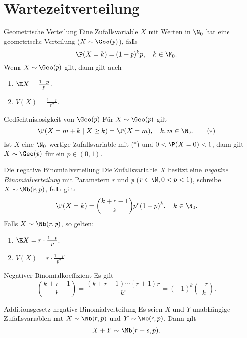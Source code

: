 \section*{Wartezeitverteilung}

\begin{karte}{Geometrische Verteilung}
    Eine Zufallsvariable \( X \) mit Werten in \( \N_0 \)
    hat eine geometrische Verteilung (\( X \sim \Geo(p) \)), falls 
    \[ \P(X=k) = (1-p)^k p, \quad k\in\N_0. \]
    Wenn \( X \sim \Geo(p) \) gilt, dann gilt auch 
    \begin{enumerate}
        \item \( \E X = \frac{1-p}{p} \).
        \item \( V(X) = \frac{1-p}{p^2} \).
    \end{enumerate}
\end{karte}

\begin{karte}{Gedächtnislosigkeit von \( \Geo(p) \)}
    Für \( X \sim \Geo(p) \) gilt 
    \[ \P(X = m+k \;|\; X \geq k ) = \P(X = m), \quad k,m\in\N_0. \tag{\(*\)} \]
    Ist \( X \) eine \( \N_0 \)-wertige Zufallsvariable mit (\(*\)) 
    und \( 0 < \P(X = 0) < 1 \), dann gilt \( X \sim \Geo(p) \) 
    für ein \( p\in (0,1) \).
\end{karte}

\begin{karte}{Die negative Binomialverteilung}
    Die Zufallsvariable \( X \) besitzt eine \textit{negative Binomialverteilung} 
    mit Parametern \( r \) und \( p \) (\( r\in \N, 0<p<1 \)), schreibe 
    \( X \sim \Nb(r,p) \), falls gilt: 
    \[ \P(X = k) = \binom{k + r - 1}{k} p^r (1-p)^k, \quad k \in \N_0. \]
    Falls \( X \sim \Nb(r,p) \), so gelten:
    \begin{enumerate}
        \item \( \E X = r \cdot \frac{1-p}{p} \).
        \item \( V(X) = r \cdot \frac{1-p}{p^2} \)
    \end{enumerate}
\end{karte}

\begin{karte}{Negativer Binomialkoeffizient}
    Es gilt 
    \[ \binom{k+r-1}{k} = \frac{ (k + r - 1)\cdots (r + 1) r }{k!}
    = (-1)^k \binom{-r}{k}. \]
\end{karte}

\begin{karte}{Additionsgesetz negative Binomialverteilung}
    Es seien \( X \) und \(Y\) unabhängige Zufallsvariablen 
    mit \( X \sim \Nb(r,p) \) und \( Y \sim \Nb(r,p) \). 
    Dann gilt 
    \[ X + Y \sim \Nb(r + s, p). \]
\end{karte}
